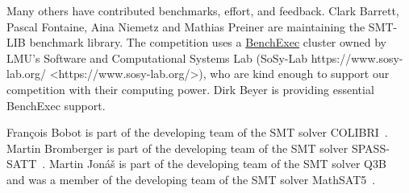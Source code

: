 \documentclass[12pt]{article}
\begin{document}
Many others have contributed benchmarks, effort, and feedback.  Clark Barrett,
Pascal Fontaine, Aina Niemetz and Mathias Preiner are maintaining the SMT-LIB
benchmark library.
The competition uses a \href{https://github.com/sosy-lab/benchexec}{BenchExec} cluster
owned by LMU's Software and Computational Systems Lab (SoSy-Lab https://www.sosy-lab.org/ <https://www.sosy-lab.org/>),
who are kind enough to support our competition with their computing power. Dirk Beyer
is providing essential BenchExec support.

Fran\c{c}ois Bobot is part of the developing team of the SMT solver COLIBRI~\cite{colibri}.
%
Martin Bromberger is part of the developing team of the SMT solver
SPASS-SATT~\cite{spass-satt}.
%
Martin Jon\'{a}\v{s} is part of the developing team of the SMT solver Q3B~\cite{Q3B} and was a member of the developing team of the SMT solver MathSAT5~\cite{MathSAT5}.


\pagebreak



\end{document}
